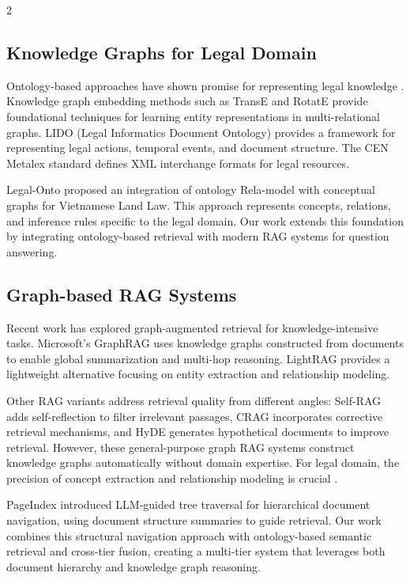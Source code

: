 \documentclass[11pt,a4paper]{article}
\begin{document}
\begin{multicols}{2}
\subsection{Knowledge Graphs for Legal Domain}

Ontology-based approaches have shown promise for representing legal knowledge \cite{ref8}. Knowledge graph embedding methods such as TransE \cite{ref_transe} and RotatE \cite{ref_rotateE} provide foundational techniques for learning entity representations in multi-relational graphs. LIDO (Legal Informatics Document Ontology) provides a framework for representing legal actions, temporal events, and document structure. The CEN Metalex standard defines XML interchange formats for legal resources.

Legal-Onto \cite{ref6} proposed an integration of ontology Rela-model \cite{ref10} with conceptual graphs for Vietnamese Land Law. This approach represents concepts, relations, and inference rules specific to the legal domain. Our work extends this foundation by integrating ontology-based retrieval with modern RAG systems for question answering.

\subsection{Graph-based RAG Systems}

Recent work has explored graph-augmented retrieval for knowledge-intensive tasks. Microsoft's GraphRAG \cite{ref4} uses knowledge graphs constructed from documents to enable global summarization and multi-hop reasoning. LightRAG \cite{ref5} provides a lightweight alternative focusing on entity extraction and relationship modeling.

Other RAG variants address retrieval quality from different angles: Self-RAG \cite{ref_selfrag} adds self-reflection to filter irrelevant passages, CRAG \cite{ref_crag} incorporates corrective retrieval mechanisms, and HyDE \cite{ref_hyde} generates hypothetical documents to improve retrieval. However, these general-purpose graph RAG systems construct knowledge graphs automatically without domain expertise. For legal domain, the precision of concept extraction and relationship modeling is crucial \cite{ref_wadhwa}.

PageIndex \cite{ref14} introduced LLM-guided tree traversal for hierarchical document navigation, using document structure summaries to guide retrieval. Our work combines this structural navigation approach with ontology-based semantic retrieval and cross-tier fusion, creating a multi-tier system that leverages both document hierarchy and knowledge graph reasoning.


\end{multicols}
\end{document}
